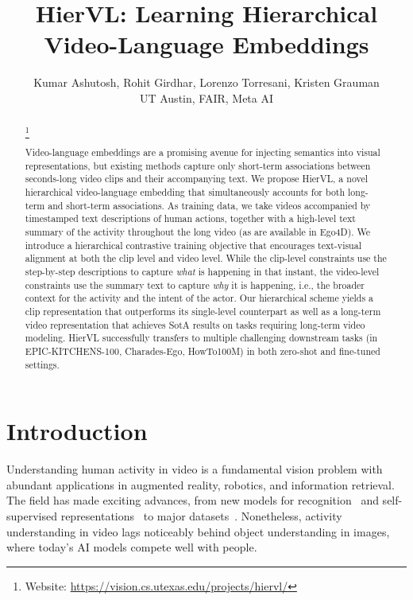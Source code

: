 \documentclass[10pt,twocolumn,letterpaper]{article}
\newcommand\blfootnote[1]{\begingroup
  \renewcommand\thefootnote{}\footnote{#1}\addtocounter{footnote}{-1}\endgroup
}
\newcommand{\modelname}[0]{{HierVL}}
\begin{document}
\title{\modelname: Learning Hierarchical Video-Language Embeddings}



\author{Kumar Ashutosh, Rohit Girdhar, Lorenzo Torresani, Kristen Grauman\\
UT Austin, FAIR, Meta AI\\
}
\maketitle





\begin{abstract}
\blfootnote{Website: \href{https://vision.cs.utexas.edu/projects/hiervl/}{https://vision.cs.utexas.edu/projects/hiervl/}}
Video-language embeddings are a promising avenue for injecting semantics into visual representations, but existing methods capture only short-term associations between seconds-long video clips and their accompanying text. 
We propose \modelname, a novel hierarchical video-language embedding 
that simultaneously accounts for both long-term and short-term associations. 
As training data, we take videos accompanied by timestamped text descriptions of human actions, together with a high-level text summary of the activity throughout the long video (as are available in Ego4D).
We introduce a hierarchical contrastive training objective that encourages text-visual alignment at both the clip level and video level.
While the clip-level constraints use the step-by-step descriptions to capture  \emph{what} is happening in that instant, the video-level constraints use the summary text to capture \emph{why} it is happening, i.e., the broader context for the activity and the intent of the actor.
Our hierarchical scheme
yields a clip representation that outperforms its single-level counterpart as well as a long-term video representation that achieves SotA results on tasks requiring long-term video modeling.  HierVL
successfully transfers to multiple challenging downstream tasks (in EPIC-KITCHENS-100, Charades-Ego, HowTo100M) in both zero-shot and fine-tuned settings.

\end{abstract} \section{Introduction}
\label{sec:intro}


Understanding human activity in video is a fundamental vision problem with abundant applications in augmented reality, robotics, and information retrieval.  The field has made exciting advances, from new models for recognition~\cite{mvitv2,memvit,slowfast} and self-supervised representations~\cite{mil-nce,univl,videoclip,egovlp}  to major datasets~\cite{ego4d,howto100m,epic-kitchens-100,crosstask,charades-ego}.  Nonetheless, activity understanding in video lags noticeably behind object understanding in images, where today's 
AI models compete well with people.
\end{document}
